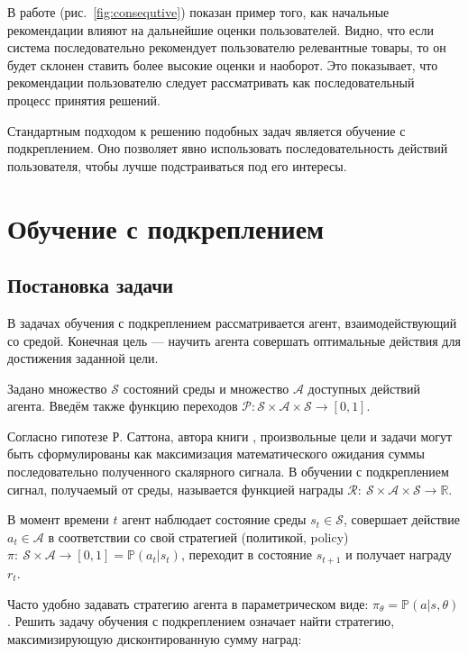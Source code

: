 \documentclass[14pt]{extarticle}
\begin{document}
В работе \cite{Liu2018DeepRL} (рис.~\ref{fig:consequtive}) показан пример того, как начальные рекомендации влияют на дальнейшие оценки пользователей. Видно, что если система последовательно рекомендует пользователю релевантные товары, то он будет склонен ставить более высокие оценки и наоборот. Это показывает, что рекомендации пользователю следует рассматривать как последовательный процесс принятия решений.

Стандартным подходом к решению подобных задач является обучение с подкреплением. Оно позволяет явно использовать последовательность действий пользователя, чтобы лучше подстраиваться под его интересы. 

\newpage

\section{Обучение с подкреплением}

\subsection{Постановка задачи}

В задачах обучения с подкреплением рассматривается агент, взаимодействующий со средой. Конечная цель --- научить агента совершать оптимальные действия для достижения заданной цели.

Задано множество $\mathcal{S}$ состояний среды и множество $\mathcal{A}$ доступных действий агента.
Введём также функцию переходов $\mathcal{P}: \mathcal{S} \times \mathcal{A} \times \mathcal{S} \rightarrow [0, 1]$.

Согласно гипотезе Р. Саттона, автора книги \cite{sutton_book}, произвольные цели и задачи могут быть сформулированы как максимизация математического ожидания суммы последовательно полученного скалярного сигнала. В обучении с подкреплением сигнал, получаемый от среды, называется функцией награды $\mathcal{R} :\ \mathcal{S} \times \mathcal{A} \times \mathcal{S} \rightarrow \mathbb{R}$.

В момент времени $t$ агент наблюдает состояние среды $s_t\in \mathcal{S}$, совершает действие $a_t\in \mathcal{A}$ в соответствии со свой стратегией (политикой, policy) $\pi:\ \mathcal{S} \times  \mathcal{A} \rightarrow [0, 1]= \mathbb{P}(a_t|s_t)$, переходит в состояние $s_{t+1}$ и получает награду $r_t$.

Часто удобно задавать стратегию агента в параметрическом виде:
$\pi_{\theta} = \mathbb{P} (a|s, \theta)$. 
Решить задачу обучения с подкреплением означает найти стратегию, максимизирующую дисконтированную сумму наград:
\end{document}
